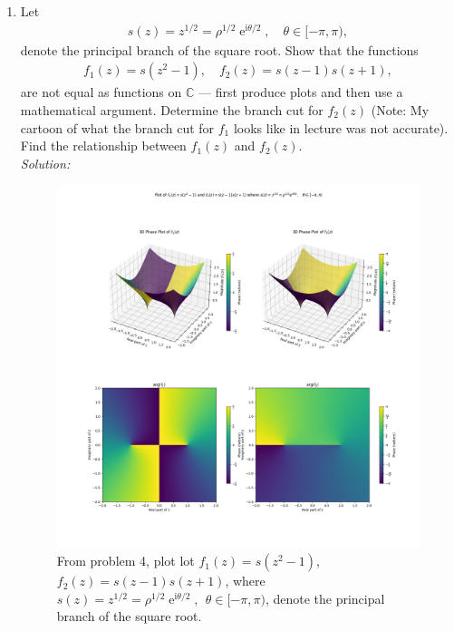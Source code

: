 \documentclass[10pt]{amsart}
\newcommand{\I}{\mathrm{i}}
\DeclareMathOperator{\E}{e}
\theoremstyle{nonumberplain}
\begin{document}
\begin{enumerate}[label={\bf {\arabic*}:}]
\item Let
  \begin{align*}
    s(z) = z^{1/2} = \rho^{1/2} \E^{\I \theta/2}, \quad \theta \in [-\pi,\pi),
  \end{align*}
  denote the principal branch of the square root.  Show that the
  functions
  \begin{align*}
    f_1(z) = s(z^2 -1), \quad f_2(z) = s(z-1) s(z+1),
  \end{align*}
  are not equal as functions on $\mathbb C$ --- first produce plots and then use a mathematical argument.  Determine the branch cut for $f_2(z)$ (Note: My
  cartoon of what the branch cut for $f_1$ looks like in lecture was
  not accurate).  Find the relationship between $f_1(z)$ and $f_2(z)$.\\
\textit{Solution:} \\
\begin{figure}[h]
	\centering
	\includegraphics[width=1\textwidth]{problem_4_vis.png}
 	\caption{
	From problem 4, plot lot $f_1(z) = s(z^2 -1)$, $f_2(z) = s(z-1) s(z+1)$, where $s(z) = z^{1/2} = \rho^{1/2} \E^{\I \theta/2},\:\:
	\theta \in [-\pi,\pi)$, denote the principal branch of the square root.}\label{fig:f1}
\end{figure}


\end{enumerate}
\end{document}
